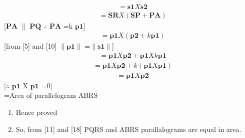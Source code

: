 \documentclass{article}
\begin{document}
\begin{multicols}{2}
\begin{align}
\end{align}
\begin{align}
&=\boldsymbol{s1} X \boldsymbol{s2}
\end{align}
\begin{align}
&=\boldsymbol{SR} X \boldsymbol{(SP+PA)}
\end{align}
 \hspace{3cm} [$\boldsymbol{PA}$ $\parallel$ $\boldsymbol{PQ}$ $\therefore$ $\boldsymbol{PA}$ =k $\boldsymbol{p1}$]
\begin{align}
 &=\boldsymbol{p1} X (\boldsymbol{p2}+k \boldsymbol{p1})
\end{align}  
[from [5] and [10] $\lVert{\textbf{p1}}\rVert$ =$\lVert{\textbf{s1}}\rVert$] 
\begin{align}
&=\boldsymbol{p1} X \boldsymbol{p2} +\boldsymbol{p1} X k \boldsymbol{p1}
\end{align}
\begin{align}
&=\boldsymbol{p1} X \textbf{p2} +k(\boldsymbol{p1} X \boldsymbol{p1})
\end{align}
\begin{align}
&=\boldsymbol{p1} X \boldsymbol{p2}
\end{align}     
   \hspace{3cm} [$\therefore$ $\boldsymbol{p1}$ X $\boldsymbol{p1}$ =0]\\
=Area of parallelogram ABRS\\
\begin{enumerate}
\item[] Hence proved
\item[] So, from [11] and [18] PQRS and ABRS parallalograms are equal in area.
\end{enumerate} 

\end{multicols}
\end{document}
